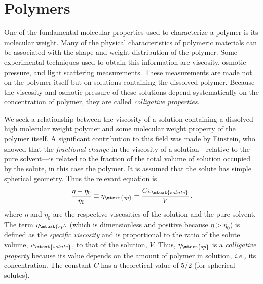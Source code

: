 \documentclass[nobib,nofonts,nols,nohyper]{tufte-handout}
\begin{document}

\section{Polymers} %
\label{sec:polymers}

One of the fundamental molecular properties used to characterize a polymer is its molecular weight. Many of the physical characteristics of polymeric materials can be associated with the shape and weight distribution of the polymer. Some experimental techniques used to obtain this information are viscosity, osmotic pressure, and light scattering measurements. These measurements are made not on the polymer itself but on solutions containing the dissolved polymer. Because the viscosity and osmotic pressure of these solutions depend systematically on the concentration of polymer, they are called \emph{colligative properties}. 

We seek a relationship between the viscosity of a solution containing a dissolved high molecular weight polymer and some molecular weight property of the polymer itself. 
A significant contribution to this field was made by Einstein,\cite{einstein06} who showed that the \emph{fractional change} in the viscosity of a solution---relative to the pure solvent---is related to the fraction of the total volume of solution occupied by the solute, in this case the polymer. 
It is assumed that the solute has simple spherical geometry. 
Thus the relevant equation is
\begin{equation}
	\frac{\eta - \eta_0}{\eta_0} \equiv \eta_\mtext{sp} = \frac{C v_\mtext{solute}}{V} \, ,
	\label{eq:frac_visc1}
\end{equation}
where \( \eta \) and \( \eta_0 \) are the respective viscosities of the solution and the pure solvent. 
The term \( \eta_\mtext{sp} \) (which is dimensionless and positive because \( \eta > \eta_0 \)) is defined as the \emph{specific viscosity} and is proportional to the ratio of the solute volume, \( v_\mtext{solute} \), to that of the solution, \( V \). 
Thus, \( \eta_\mtext{sp} \) is a \emph{colligative property} because its value depends on the amount of polymer in solution, \emph{i.e.,} its concentration. 
The constant \( C \) has a theoretical value of \( 5/2 \) (for spherical solutes). 
\end{document}
